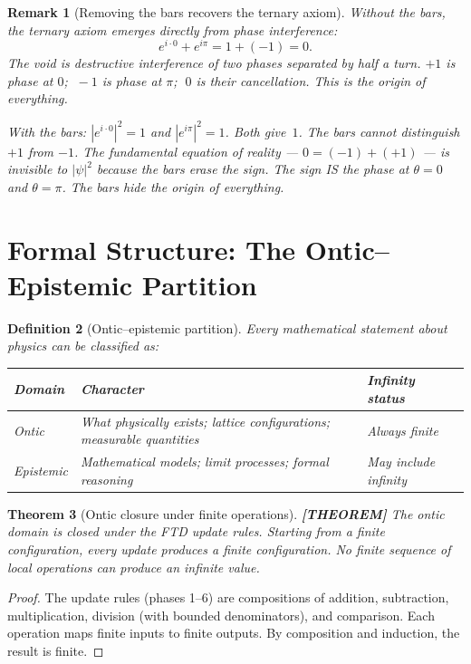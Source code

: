 \documentclass[11pt]{article}
\theoremstyle{tight}
\newtheorem{theorem}{Theorem}[section]
\theoremstyle{plainroman}
\newtheorem{remark}[theorem]{Remark}
\newtheorem{definition}[theorem]{Definition}
\begin{document}
\begin{remark}[Removing the bars recovers the ternary axiom]
Without the bars, the ternary axiom emerges directly from phase interference:
\[
e^{i\cdot 0}+e^{i\pi}=1+(-1)=0.
\]
The void is destructive interference of two phases separated by half a turn.
$+1$ is phase at $0$; $\;-1$ is phase at $\pi$; $\;0$ is their cancellation.
This is the origin of everything.

\emph{With} the bars: $|e^{i\cdot 0}|^2=1$ and $|e^{i\pi}|^2=1$.
Both give~$1$.
The bars cannot distinguish $+1$ from $-1$.
The fundamental equation of reality --- $0=(-1)+(+1)$ --- is \emph{invisible} to $|\psi|^2$ because the bars erase the sign.
The sign IS the phase at $\theta=0$ and $\theta=\pi$.
The bars hide the origin of everything.
\end{remark}

\section{Formal Structure: The Ontic--Epistemic Partition}

\begin{definition}[Ontic--epistemic partition]
Every mathematical statement about physics can be classified as:
\begin{center}
\renewcommand{\arraystretch}{1.25}
\begin{tabular}{p{} p{} p{}}
\toprule
\textbf{Domain} & \textbf{Character} & \textbf{Infinity status} \\
\midrule
Ontic & What physically exists; lattice configurations; measurable quantities & Always finite \\
Epistemic & Mathematical models; limit processes; formal reasoning & May include infinity \\
\bottomrule
\end{tabular}
\end{center}
\end{definition}

\begin{theorem}[Ontic closure under finite operations]\label{thm:closure}
\textbf{[THEOREM]}
The ontic domain is closed under the FTD update rules.
Starting from a finite configuration, every update produces a finite configuration.
No finite sequence of local operations can produce an infinite value.
\end{theorem}
\begin{proof}
The update rules (phases 1--6) are compositions of addition, subtraction, multiplication, division (with bounded denominators), and comparison.
Each operation maps finite inputs to finite outputs.
By composition and induction, the result is finite.
\end{proof}
\end{document}
